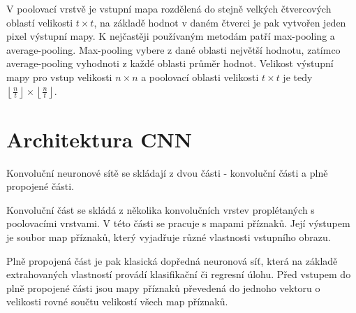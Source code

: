 V poolovací vrstvě je vstupní mapa rozdělená do stejně velkých čtvercových
oblastí velikosti $t \times t$, na základě hodnot v daném čtverci je pak
vytvořen jeden pixel výstupní mapy. K nejčastěji používaným metodám patří
max-pooling a average-pooling. Max-pooling vybere z dané oblasti největší
hodnotu, zatímco average-pooling vyhodnoti z každé oblasti průměr hodnot.
Velikost výstupní mapy pro vstup velikosti $n \times n$ a poolovací oblasti
velikosti $t \times t$ je tedy $\left\lfloor \frac{n}{t} \right\rfloor \times
    \left\lfloor \frac{n}{t} \right\rfloor$.

\section{Architektura CNN}

Konvoluční neuronové sítě se skládají z dvou části - konvoluční části a plně
propojené části.

Konvoluční část se skládá z několika konvolučních vrstev proplétaných s
poolovacími vrstvami. V této části se pracuje s mapami příznaků. Její výstupem
je soubor map příznaků, který vyjadřuje různé vlastnosti vstupního obrazu.

Plně propojená část je pak klasická dopředná neuronová síť, která na základě
extrahovaných vlastností provádí klasifikační či regresní úlohu. Před vstupem
do plně propojené části jsou mapy příznaků převedená do jednoho vektoru o
velikosti rovné součtu velikostí všech map příznaků.

\endinput
